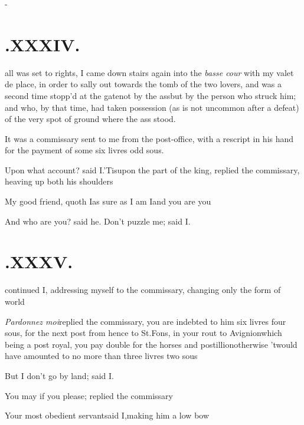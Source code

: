 \documentclass{article}
\begin{document}
\vfill{}\eject
\null\kern-\baselineskip
\section{.\enspace XXXIV.}

 all was set to rights, I\break
came down stairs again into the\break
\textit{basse cour} with my valet de place, in order to
sally out towards the tomb of the two lovers, \etc\tsk and was a
second time stopp’d at the gate\tsh not by the ass\tsk but by
the person who struck him; and who, by that time, had taken
possession (as is not uncommon after a defeat) of the very spot
of ground where the ass stood.

It was a commissary sent to me from the post-office, with a
rescript in his hand for the payment of some six livres odd
sous.

Upon what account? said I.\tsh ’Tis\break upon the part
of the king, replied the commissary, heaving up both his
shoulders\tsh

\tsh My good friend, quoth I\tsh as sure as I
am I\tsk and you are you\tsh

\tsh And who are you? said he.\tsh\break
\tsh Don’t puzzle me; said I.

\section{.\enspace XXXV.}

\noindent
{}
continued I, addressing myself to the commissary, changing only
the form of 
world\tsh

\textit{Pardonnez moi}\tsk replied the commissary, you are
indebted to him six livres
four sous, for the next post from hence to St.\@ Fons, in your
rout to Avignion\tsk which being a post royal, you pay double
for the horses and postillion\tsk otherwise ’twould have
amounted to no more than three livres two sous\tsh

\tsh But I don’t go by land; said I.

\tsh You may if you please; replied the commissary\tsh

Your most obedient servant\tsh said I,\break making him a low bow\tsh
\end{document}
